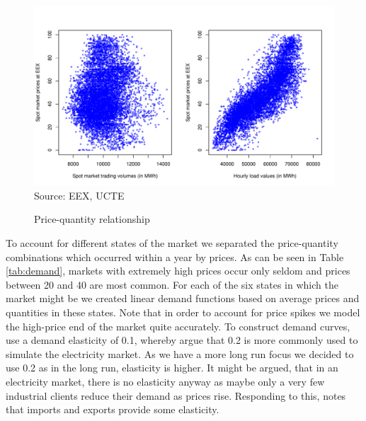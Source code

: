 \begin{figure}[htb]
  \centering
\caption{Price-quantity relationship}
  \includegraphics[width=.8\textwidth]{germandata/pricequant.pdf}
  \label{fig:investcosts}
\\
 \scriptsize Source: EEX, UCTE
\end{figure}

To account for different states of the market we separated the price-quantity combinations which occurred within a year by prices. As can be seen in Table \ref{tab:demand}, markets with extremely high prices occur only seldom and prices between 20 and 40 are most common. For each of the six states in which the market might be we created linear demand functions based on average prices and quantities in these states. Note that in order to account for price spikes we model the high-price end of the market quite accurately. To construct demand curves, \cite{Neuhoff2005} use a demand elasticity of 0.1, whereby \cite{Genc2007} argue that 0.2 is more commonly used to simulate the electricity market. As we have a more long run focus we decided to use 0.2 as in the long run, elasticity is higher. It might be argued, that in an electricity market, there is no elasticity anyway as maybe only a very few industrial clients reduce their demand as prices rise. Responding to this, \cite{Bushnell2003} notes that imports and exports provide some elasticity.

